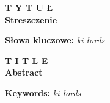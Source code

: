 
\begin{center}
	\fontsize{18pt}{12pt}\selectfont\textbf{T Y T U Ł}\\
	\vspace{1cm}
	\fontsize{15pt}{12pt}\selectfont
	\textbf{Streszczenie}
\end{center}
\vspace{1cm}

\noindent\textbf{Słowa kluczowe:} \textit{ki łords}\\
\newpage
\null
\newpage
\begin{center}
	\fontsize{18pt}{12pt}\selectfont\textbf{T I T L E}\\
	\vspace{1cm}
	\fontsize{14pt}{12pt}\selectfont
	\textbf{Abstract}
\end{center}
\vspace{1cm}

\noindent\textbf{Keywords:} \textit{ki łords}\\
\vspace{1.5cm}

\newpage
\null
\newpage
